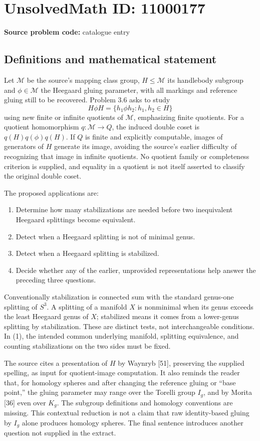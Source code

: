 \documentclass[11pt]{article}
\begin{document}
\section*{UnsolvedMath ID: 11000177}
\textbf{Source problem code:} catalogue entry
\subsection{Definitions and mathematical statement}
Let \(\mathcal M\) be the source's mapping class group, \(H\le\mathcal M\) its handlebody subgroup and \(\phi\in\mathcal M\) the Heegaard gluing parameter, with all markings and reference gluing still to be recovered. Problem 3.6 asks to study
\[
 H\phi H=\{h_1\phi h_2:h_1,h_2\in H\}
\]
using new finite or infinite quotients of \(\mathcal M\), emphasizing finite quotients. For a quotient homomorphism \(q:\mathcal M\to Q\), the induced double coset is \(q(H)q(\phi)q(H)\). If \(Q\) is finite and explicitly computable, images of generators of \(H\) generate its image, avoiding the source's earlier difficulty of recognizing that image in infinite quotients. No quotient family or completeness criterion is supplied, and equality in a quotient is not itself asserted to classify the original double coset.

The proposed applications are:
\begin{enumerate}
\item Determine how many stabilizations are needed before two inequivalent Heegaard splittings become equivalent.
\item Detect when a Heegaard splitting is not of minimal genus.
\item Detect when a Heegaard splitting is stabilized.
\item Decide whether any of the earlier, unprovided representations help answer the preceding three questions.
\end{enumerate}
Conventionally stabilization is connected sum with the standard genus-one splitting of \(S^3\). A splitting of a manifold \(X\) is nonminimal when its genus exceeds the least Heegaard genus of \(X\); stabilized means it comes from a lower-genus splitting by stabilization. These are distinct tests, not interchangeable conditions. In (1), the intended common underlying manifold, splitting equivalence, and counting stabilizations on the two sides must be fixed.

The source cites a presentation of \(H\) by Waynryb [51], preserving the supplied spelling, as input for quotient-image computation. It also reminds the reader that, for homology spheres and after changing the reference gluing or ``base point,'' the gluing parameter may range over the Torelli group \(I_g\), and by Morita [36] even over \(K_g\). The subgroup definitions and homology conventions are missing. This contextual reduction is not a claim that raw identity-based gluing by \(I_g\) alone produces homology spheres. The final sentence introduces another question not supplied in the extract.
\end{document}
